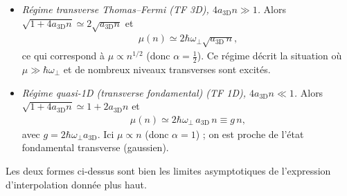 \begin{itemize}[label =$\bullet$]
	\item \emph{Régime transverse Thomas--Fermi (\gls{TF} 3D), \(4a_{\mathrm{3D}}n\gg1\).} 
		Alors \(\sqrt{1+4a_{\mathrm{3D}}n}\simeq 2\sqrt{a_{\mathrm{3D}}n}\) et
		\begin{eqnarray}
			\mu(n)\simeq 2\hbar\omega_\perp\sqrt{a_{\mathrm{3D}}\,n},
		\end{eqnarray}
		ce qui correspond à \(\mu\propto n^{1/2}\) (donc \(\alpha=\tfrac12\)). Ce régime décrit la situation où \(\mu\gg\hbar\omega_\perp\) et de nombreux niveaux transverses sont excités.
	\item \emph{Régime quasi-1D (transverse fondamental) (\gls{TF} 1D), \(4a_{\mathrm{3D}}n\ll1\).} 
		Alors \(\sqrt{1+4a_{\mathrm{3D}}n}\simeq 1+2a_{\mathrm{3D}}n\) et
		\begin{eqnarray}
			\mu(n)\simeq 2\hbar\omega_\perp\,a_{\mathrm{3D}}\,n \equiv g\,n,
		\end{eqnarray}
	avec \(g=2\hbar\omega_\perp a_{\mathrm{3D}}\). Ici \(\mu\propto n\) (donc \(\alpha=1\)) ; on est proche de l'état fondamental transverse (gaussien).
\end{itemize}

Les deux formes ci-dessus sont bien les limites asymptotiques de l'expression d'interpolation donnée plus haut.


%
%
%
%
% 



